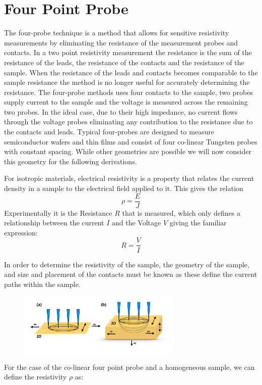 \section{Four Point Probe}

    
    The four-probe technique is a method that allows for sensitive resistivity measurements by eliminating the resistance of the measurement probes and contacts. In a two point resistivity measurement the resistance is the sum of the resistance of the leads, the resistance of the contacts and the resistance of the sample. %
    When the resistance of the leads and contacts becomes comparable to the sample resistance the method is no longer useful for accurately determining the resistance. The four-probe methods uses four contacts to the sample, two probes supply current to the sample and the voltage is measured across the remaining two probes. In the ideal case, due to their high impedance, no current flows through the voltage probes eliminating any contribution to the resistance due to the contacts and leads. Typical four-probes are designed to measure semiconductor wafers and thin films and consist of four co-linear Tungsten probes with constant spacing. While other geometries are possible %
    we will now consider this geometry for the following derivations. 
    

 
    For isotropic materials, electrical resistivity is a property that relates the current density in a sample to the electrical field applied to it. This gives the relation \begin{equation}
        \rho = \frac{E}{J}
    \end{equation}
    Experimentally it is the Resistance $R$ that is measured, which only defines a relationship between the current $I$ and the Voltage $V$ giving the familiar expression: \begin{equation}
        R = \frac{V}{I}
    \end{equation}
    
    In order to determine the resistivity of the sample, the geometry of the sample, and size and placement of the contacts must be known as these define the current paths within the sample. 
    
    \begin{figure}[h]
        \centering
        \includegraphics[width=0.7\textwidth]{fig/4pp/4pp_current.png}
        \caption{\cite{Miccoli2015TheSystems}}
        \label{fig:4ppcurret}
    \end{figure}
    For the case of the co-linear four point probe and a homogeneous sample, we can define the resistivity $\rho$ as:
    

